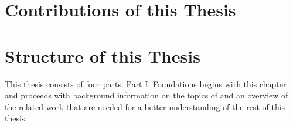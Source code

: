 \section{Contributions of this Thesis}
\label{sec:contributions}

\section{Structure of this Thesis}
\label{sec:structure}

This thesis consists of four parts. Part I: Foundations begins with this chapter and proceeds with background information on the topics of  and an overview of the related work that are needed for a better understanding of the rest of this thesis. 
